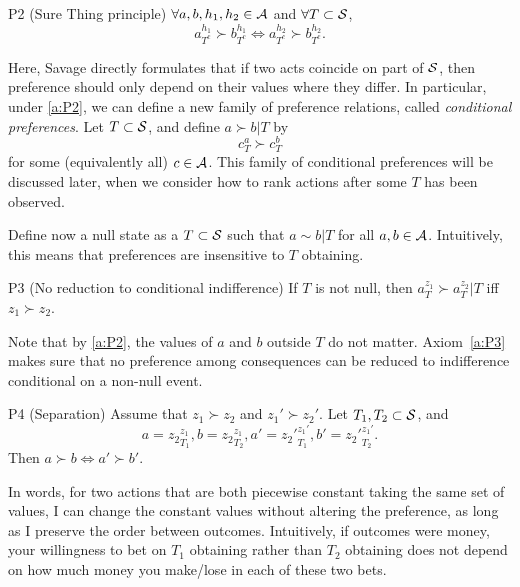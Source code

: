 \begin{axiom}{P2 (Sure Thing principle)}\label{a:P2}
$\forall a,b,h_1,h_2\in\mathcal{A}$ and $\forall T\subset\mathcal{S}$,
$$ a_{T^c}^{h_1} \succ b_{T^c}^{h_1} \Leftrightarrow a_{T^c}^{h_2} \succ b_{T^c}^{h_2}.$$
\end{axiom}
Here, Savage directly formulates that if two acts coincide on part of $\mathcal{S}$, then preference should only depend on their values where they differ. 
In particular, under \ref{a:P2}, we can define a new family of preference relations, called \emph{conditional preferences}.
Let $T\subset\mathcal{S}$, and define $a\succ b\vert T$ by
\begin{equation}
c_{T}^a \succ c_T^b
\label{e:conditionalPreference}
\end{equation}
for some (equivalently all) $c\in \mathcal{A}$. 
This family of conditional preferences will be discussed later, when we consider how to rank actions after some $T$ has been observed.
\begin{example}[Continuation of Example~\ref{e:binary_classification}]
\end{example}


Define now a null state as a $T\subset\mathcal{S}$ such that $a\sim b\vert T$ for all $a,b\in\mathcal{A}$. Intuitively, this means that preferences are insensitive to $T$ obtaining.
\begin{axiom}{P3 (No reduction to conditional indifference)}\label{a:P3}
If $T$ is not null, then $a_{T}^{z_1}\succ a_T^{z_2}\vert T$ iff $z_1\succ z_2$.
\end{axiom}
Note that by \ref{a:P2}, the values of $a$ and $b$ outside $T$ do not matter. Axiom~\ref{a:P3} makes sure that no preference among consequences can be reduced to indifference conditional on a non-null event. 

\begin{axiom}{P4 (Separation)}\label{a:P4}
Assume that $z_1\succ z_2$ and $z_1'\succ z_2'$. Let $T_1,T_2\subset \mathcal{S}$, and
$$a = {z_2}_{T_1}^{z_1}, b = {z_2}_{T_2}^{z_1}, a'={z_2'}_{T_1}^{z_1'}, b'= {z_2'}_{T_2}^{z_1'}.$$
Then $a\succ b\Leftrightarrow a'\succ b'$.
\end{axiom}
In words, for two actions that are both piecewise constant taking the same set of values, I can change the constant values without altering the preference, as long as I preserve the order between outcomes. Intuitively, if outcomes were money, your willingness to bet on $T_1$ obtaining rather than $T_2$ obtaining does not depend on how much money you make/lose in each of these two bets.

